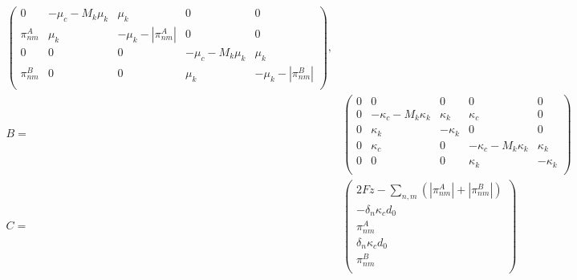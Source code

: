 \documentclass[a4paper,12pt]{article}
\begin{document}
\begin{itemize}
\begin{equation}
\begin{aligned}
\begin{pmatrix}
      0 &  -\mu_c - M_k \mu_k& \mu_k & 0 & 0\\
      \pi_{nm}^A & \mu_k & - \mu_k - |\pi_{nm}^A| & 0& 0\\
      0&0&0 & -\mu_c - M_k \mu_k & \mu_k\\
      \pi_{nm}^B & 0&0 & \mu_k & - \mu_k - |\pi_{nm}^B| \\
    \end{pmatrix}, \\
    B = &%
    \begin{pmatrix}
      0 & 0&0&0&0\\
      0 & - \kappa_c - M_k \kappa_k & \kappa_k &%
      \kappa_c & 0 \\
      0 & \kappa_k & -\kappa_k & 0&0\\
      0 & \kappa_c & 0 &%
      -\kappa_c - M_k \kappa_k & \kappa_k \\
      0&0&0 & \kappa_k & - \kappa_k\\
    \end{pmatrix}\\
    C = &%
    \begin{pmatrix}
      2Fz - \sum_{n,m}(|\pi_{nm}^A| + |\pi_{nm}^B|) \\
      - \delta_n \kappa_c d_0\\
      \pi_{nm}^A\\
      \delta_n \kappa_c d_0\\
      \pi_{nm}^B\\
    \end{pmatrix}
\end{aligned}
\end{equation}


\end{itemize}
\end{document}

